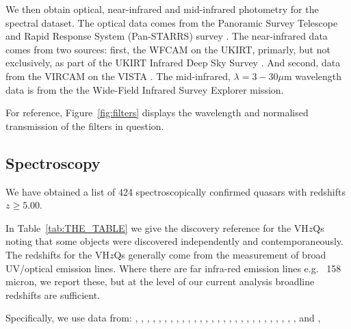 \documentclass[usenatbib]{mnras}
\begin{document}
We then obtain optical, near-infrared and mid-infrared photometry for
the spectral dataset. The optical data comes from the Panoramic Survey
Telescope and Rapid Response System (Pan-STARRS) survey
\citep{Chambers2016}. The near-infrared data comes from two sources:
first, the WFCAM \citep[][]{Casali2007} on the UKIRT, primarly, but
not exclusively, as part of the UKIRT Infrared Deep Sky Survey
\citep[UKIDSS; ][]{Lawrence2007}.  And second, data from the VIRCAM on
the VISTA \citep[][]{Emerson2006, Dalton2006}. The mid-infrared,
$\lambda=3-30\mu$m wavelength data is from the the Wide-Field Infrared
Survey Explorer \citep[WISE;][]{Wright2010, Cutri2013} mission.

For reference, Figure~\ref{fig:filters} displays the wavelength and normalised transmission 
of the filters in question. 





\subsection{Spectroscopy} 
We have obtained a list of 424 spectroscopically confirmed 
quasars with redshifts $z\geq5.00$. 

In Table~\ref{tab:THE_TABLE}  we give the discovery reference for the
VH$z$Qs noting that some objects were discovered independently and
contemporaneously.  The redshifts for the VH$z$Qs generally come from
the measurement of broad UV/optical emission lines. Where 
there are far infra-red emission lines e.g. \cii~158 micron, we report 
these, but at the level of our current analysis broadline redshifts are
sufficient. 

Specifically, we use data from: 
\citet{Banados2014, Banados2016, Banados2018}, 
\citet{Becker2015}, 
\citet{Calura2014}, 
\citet{Carilli2007, Carilli2010}, 
\citet{Carnall2015}, 
\citet{Cool2006}, 
\citet{DeRosa2011}, 
\citet{Fan2000, Fan2001c, Fan2003, Fan2004, Fan2006, Fan2018}, 
\citet{Goto2006}, 
\citet{Ikeda2017}, 
\citet{Jiang2008, Jiang2009, Jiang2015},  
\citet{Kashikawa2015}, 
\citet{Koptelova2017}, 
\citet{Kim2015}, 
\citet{Kurk2007, Kurk2009}, 
\citet{Leipski2014}, 
\citet{Mahabal2005}, 
\citet{Matsuoka2016,  Matsuoka2018a, Matsuoka2018b},   
\citet{Mazzucchelli2017}, 
\citet{Morganson2012}, 
\citet{Mortlock2009, Mortlock2011},
\citet{McGreer2006, McGreer2013},  
\citet{Reed2015, Reed2017}, 
\citet{Stern2007},  
\citet{Tang2017}, 
\citet{Venemans2007, Venemans2012, Venemans2013, Venemans2015a, Venemans2015b, Venemans2016},
\citet{WangF2016, WangF2017, WangF2018a, WangF2018b},
\citet{Willott2007, Willott2009, Willott2010a, Willott2010b, Willott2013b, Willott2015}, 
\citet{Wu2015} 
\citet{YangJ2018}  
and 
\citet{Zeimann2011}, 
\end{document}
